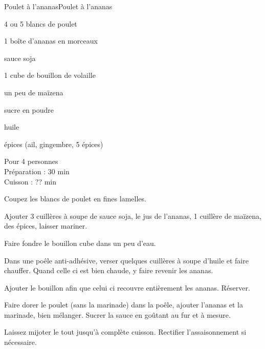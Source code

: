 \begin{recette}{Poulet à l'ananas}{Poulet à l'ananas}

\begin{ingredients}
4 ou 5 blancs de poulet\par
1 boîte d'ananas en morceaux\par
sauce soja\par
1 cube de bouillon de volaille\par
un peu de maïzena\par
sucre en poudre\par
huile\par
épices (ail, gingembre, 5 épices)\par
\end{ingredients}

\begin{infos}
Pour 4 personnes\\
Préparation : 30 min\\
Cuisson : ?? min\\
\end{infos}

\begin{etapes}
\item Coupez les blancs de poulet en fines lamelles.
\item Ajouter 3 cuillères à soupe de sauce soja, le jus de l'ananas, 1 cuillère de maïzena, des épices, laisser mariner.
\item Faire fondre le bouillon cube dans un peu d'eau.
\item Dans une poêle anti-adhésive, verser quelques cuillères à soupe d'huile et faire chauffer. Quand celle ci est bien chaude, y faire revenir les ananas.
\item Ajouter le bouillon afin que celui ci recouvre entièrement les ananas. Réserver.
\item Faire dorer le poulet (sans la marinade) dans la poêle, ajouter l'ananas et la marinade, bien mélanger. Sucrer la sauce en goûtant au fur et à mesure.
\item Laissez mijoter le tout jusqu'à complète cuisson. Rectifier l'assaisonnement si nécessaire.
\end{etapes}

\end{recette}